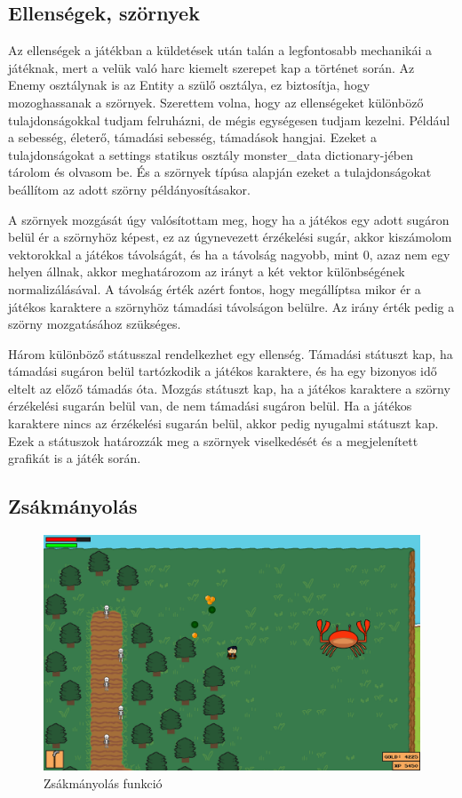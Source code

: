 \subsection{Ellenségek, szörnyek}

\indent \indent Az ellenségek a játékban a küldetések után talán a legfontosabb mechanikái a játéknak, mert a velük való harc kiemelt szerepet kap a történet során.
Az Enemy osztálynak is az Entity a szülő osztálya, ez biztosítja, hogy mozoghassanak a szörnyek. Szerettem volna, hogy az ellenségeket különböző tulajdonságokkal tudjam felruházni, de mégis egységesen tudjam kezelni. Például a sebesség, életerő, támadási sebesség, támadások hangjai. Ezeket a tulajdonságokat a settings statikus osztály monster\_data dictionary-jében tárolom és olvasom be. És a szörnyek típúsa alapján ezeket a tulajdonságokat beállítom az adott szörny példányosításakor.

A szörnyek mozgását úgy valósítottam meg, hogy ha a játékos egy adott sugáron belül ér a szörnyhöz képest, ez az úgynevezett érzékelési sugár, akkor kiszámolom vektorokkal a játékos távolságát, és ha a távolság nagyobb, mint 0, azaz nem egy helyen állnak, akkor meghatározom az irányt a két vektor különbségének normalizálásával. A távolság érték azért fontos, hogy megállíptsa mikor ér a játékos karaktere a szörnyhöz támadási távolságon belülre. Az irány érték pedig a szörny mozgatásához szükséges.

Három különböző státusszal rendelkezhet egy ellenség. Támadási státuszt kap, ha támadási sugáron belül tartózkodik a játékos karaktere, és ha egy bizonyos idő eltelt az előző támadás óta. Mozgás státuszt kap, ha a játékos karaktere a szörny érzékelési sugarán belül van, de nem támadási sugáron belül. Ha a játékos karaktere nincs az érzékelési sugarán belül, akkor pedig nyugalmi státuszt kap. Ezek a státuszok határozzák meg a szörnyek viselkedését és a megjelenített grafikát is a játék során.


\subsection{Zsákmányolás}


\begin{figure}[H]
    \centering
    \includegraphics[width=15.5truecm]{images/loots.png}
    \caption{Zsákmányolás funkció}
    \label{fig:Zsákmányolás funkció}
\end{figure}

